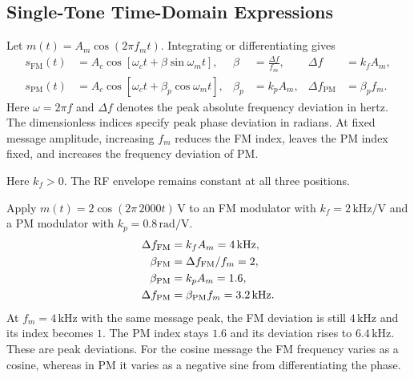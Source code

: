 \documentclass[12pt,a4paper]{article}
\begin{document}
\subsection{Single-Tone Time-Domain Expressions}
Let $m(t)=A_m\cos(2\pi f_mt)$. Integrating or differentiating gives
\[
\begin{aligned}
 s_{\mathrm{FM}}(t)&=A_c\cos[\omega_ct+\beta\sin\omega_mt],
    &\beta&=\frac{\Delta f}{f_m}, & \Delta f&=k_fA_m,\\
 s_{\mathrm{PM}}(t)&=A_c\cos[\omega_ct+\beta_p\cos\omega_mt],
    &\beta_p&=k_pA_m, &\Delta f_{\mathrm{PM}}&=\beta_p f_m.
\end{aligned}
\]
Here $\omega=2\pi f$ and $\Delta f$ denotes the peak absolute frequency deviation in hertz. The dimensionless indices specify peak phase deviation in radians. At fixed message amplitude, increasing $f_m$ reduces the FM index, leaves the PM index fixed, and increases the frequency deviation of PM.

\begin{tcolorbox}[tikzbox, unbreakable, title={FM Becomes Denser Where Instantaneous Frequency Is Higher}]
\centering
{}\par
\small Here $k_f>0$. The RF envelope remains constant at all three positions.
\end{tcolorbox}

\begin{tcolorbox}[examplebox, title={Compare FM and PM When the Message Frequency Doubles}]
Apply $m(t)=2\cos(2\pi\,2000t)\,\mathrm V$ to an FM modulator with $k_f=2\,\mathrm{kHz/V}$ and a PM modulator with $k_p=0.8\,\mathrm{rad/V}$.
\[
\begin{aligned}
 \Delta f_{\rm FM} &= k_f A_m=4\,\mathrm{kHz},\\
 \beta_{\rm FM}&=\Delta f_{\rm FM}/f_m=2,\\
 \beta_{\rm PM}&=k_pA_m=1.6,\\
 \Delta f_{\rm PM} &=\beta_{\rm PM}f_m=3.2\,\mathrm{kHz}.
\end{aligned}
\]
At $f_m=4\,\mathrm{kHz}$ with the same message peak, the FM deviation is still $4\,\mathrm{kHz}$ and its index becomes $1$. The PM index stays $1.6$ and its deviation rises to $6.4\,\mathrm{kHz}$. These are peak deviations. For the cosine message the FM frequency varies as a cosine, whereas in PM it varies as a negative sine from differentiating the phase.
\end{tcolorbox}
\end{document}
